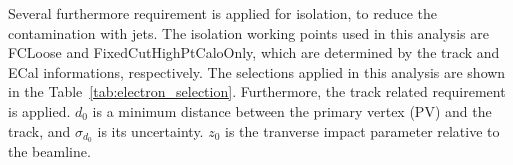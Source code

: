 Several furthermore requirement is applied for isolation, to reduce the contamination with jets. The isolation working points used in this analysis are FCLoose and FixedCutHighPtCaloOnly, which are determined by the track and ECal informations, respectively. The selections applied in this analysis are shown in the Table~\ref{tab:electron_selection}.
Furthermore, the track related requirement is applied. $d_0$ is a minimum distance between the primary vertex (PV) and the track, and $\sigma_{d_0}$ is its uncertainty. $z_0$ is the tranverse impact parameter relative to the beamline.
\begin{table}[ht]
 \label{tab:electron_selection}
 \caption{Summary of electron selection}
\end{table}


